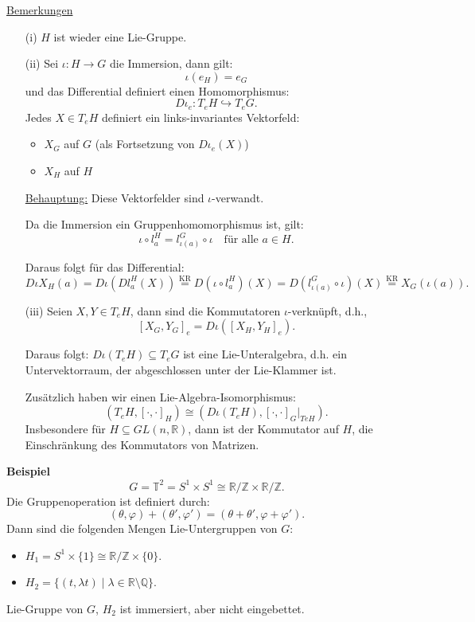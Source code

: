 \documentclass[fleqn, 12pt, letterpaper]{article}
\newcommand{\txt}[1]{\text{#1}}
\begin{document}
\underline{Bemerkungen}
\begin{itemize}
    \item[(i)] \( H \) ist wieder eine Lie-Gruppe.

    \item[(ii)] Sei \( \iota: H \rightarrow G \) die Immersion, dann gilt:
    \[
    \iota(e_H) = e_G
    \]
    und das Differential definiert einen Homomorphismus:
    \[
    D\iota_e: T_e H \hookrightarrow T_e G.
    \]
    Jedes \( X \in T_e H \) definiert ein links-invariantes Vektorfeld:
    \begin{itemize}
        \item \( X_G \) auf \( G \) (als Fortsetzung von \( D\iota_e(X) \))
        \item \( X_H \) auf \( H \)
    \end{itemize}
    \underline{Behauptung:} Diese Vektorfelder sind $\iota$-verwandt.

Da die Immersion ein Gruppenhomomorphismus ist, gilt:
\[
\iota \circ l_a^H = l_{\iota(a)}^G \circ \iota \quad \text{für alle } a \in H.
\]

Daraus folgt für das Differential:
\[
D\iota X_H(a) = D\iota \left(Dl_a^H(X)\right) \overset{\txt{KR}}{=} D(\iota \circ l_a^H)(X) = D\left(l_{\iota(a)}^G \circ \iota\right)(X) \overset{\txt{KR}}{=} X_G(\iota(a)).
\]

    \item[(iii)] Seien \( X, Y \in T_e H \), dann sind die Kommutatoren \( \iota \)-verknüpft, d.h.,
    \[
    [X_G, Y_G]_e = D\iota \left([X_H, Y_H]_e\right).
    \]

    Daraus folgt:
    \(
    D   \iota(T_e H) \subseteq T_e G
    \)
    ist eine Lie-Unteralgebra, d.h. ein Untervektorraum, der abgeschlossen unter der Lie-Klammer ist.

    Zusätzlich haben wir einen Lie-Algebra-Isomorphismus:
    \[
    (T_e H, [\cdot, \cdot]_H) \cong (D\iota(T_e H), [\cdot, \cdot]_G|_{TeH}).
    \]
    Insbesondere für \( H \subseteq GL(n, \mathbb{R}) \), dann ist der Kommutator auf \( H \), die 
    Einschränkung des Kommutators von Matrizen.
\end{itemize}

\textbf{Beispiel}
\[
G = \mathbb{T}^2 = S^1 \times S^1 \cong \mathbb{R}/\mathbb{Z} \times \mathbb{R}/\mathbb{Z}.
\]
Die Gruppenoperation ist definiert durch:
\[
(\theta, \varphi) + (\theta', \varphi') = (\theta + \theta', \varphi + \varphi').
\]
Dann sind die folgenden Mengen Lie-Untergruppen von \( G \):
\begin{itemize}
    \item \( H_1 = S^1 \times \{1\} \cong \mathbb{R}/\mathbb{Z} \times \{0\} \).
    \item \( H_2 = \{(t, \lambda t) \mid \lambda \in \mathbb{R} \setminus \mathbb{Q} \} \).
\end{itemize}
Lie-Gruppe von $G$, \( H_2 \) ist immersiert, aber nicht eingebettet.
\end{document}
